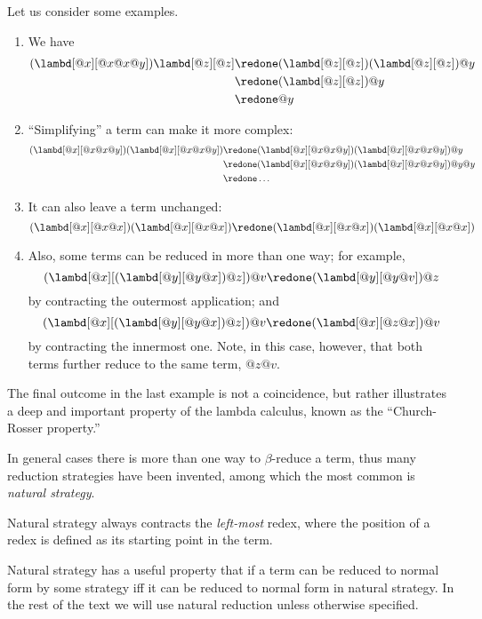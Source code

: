 \documentclass[../../../include/open-logic-section]{subfiles}
\begin{document}
Let us consider some examples.
\begin{enumerate}
\item We have
\begin{align*}
(\lambd[@x][@x@x@y]) \lambd[@z][@z] & \redone (\lambd[@z][@z])(\lambd[@z][@z]) @y \\
& \redone (\lambd[@z][@z]) @y \\
& \redone @y
\end{align*}
\item ``Simplifying'' a term can make it more complex:
\begin{align*}
(\lambd[@x][@x@x@y])(\lambd[@x][@x@x@y]) & \redone (\lambd[@x][@x@x@y])(\lambd[@x][@x@x@y])@y \\
& \redone (\lambd[@x][@x@x@y])(\lambd[@x][@x@x@y])@y@y \\
& \redone \dots
\end{align*}
\item It can also leave a term unchanged:
\[
(\lambd[@x][@x@x])(\lambd[@x][@x@x]) \redone (\lambd[@x][@x@x])(\lambd[@x][@x@x])
\]
\item Also, some terms can be reduced in more than one way; for
  example,
\[
(\lambd[@x][(\lambd[@y][@y@x]) @z]) @v \redone (\lambd[@y][@y@v]) @z
\]
by contracting the outermost application; and
\[
(\lambd[@x][(\lambd[@y][@y@x]) @z]) @v \redone (\lambd[@x][@z@x]) @v
\]
by contracting the innermost one. Note, in this case, however, that
both terms further reduce to the same term, $@z@v$.
\end{enumerate}

The final outcome in the last example is not a coincidence, but rather
illustrates a deep and important property of the lambda calculus, known as the
``Church-Rosser property.''

\begin{digress}
  In general cases there is more than one way to $\beta$-reduce a
  term, thus many reduction strategies have been invented, among which
  the most common is \emph{natural strategy}.
  
  Natural strategy always contracts the \emph{left-most}
  redex, where the position of a redex is defined as its starting
  point in the term.

  Natural strategy has a useful property that if a term can be reduced
  to normal form by some strategy iff it can be reduced to normal form in
  natural strategy. In the rest of the text we will use natural
  reduction unless otherwise specified. 
\end{digress}
\end{document}
